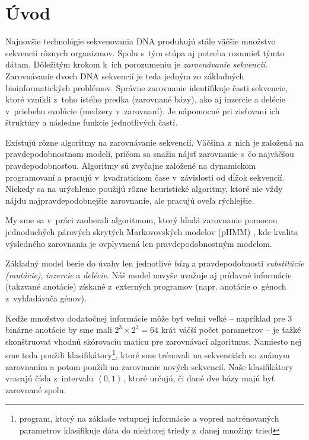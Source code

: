 \chapter*{Úvod}
{}

Najnovšie technológie sekvenovania DNA produkujú stále väčšie množstvo sekvencií rôznych organizmov. Spolu s~tým stúpa aj potreba rozumieť týmto dátam.
Dôležitým krokom k~ich porozumeniu je \textit{zarovnávanie sekvencií}.
Zarovnávanie dvoch DNA sekvencií je teda jedným zo základných
bioinformatických problémov. Správne zarovnanie identifikuje časti
sekvencie, ktoré vznikli z~toho istého predka (zarovnané bázy), ako aj
inzercie a delécie v~priebehu evolúcie (medzery v~zarovnaní).
Je nápomocné pri zisťovaní ich štruktúry a následne funkcie jednotlivých častí.

Existujú rôzne algoritmy na zarovnávanie sekvencií. Väčšina z~nich je založená na  pravdepodobnostnom modeli, pričom sa snažia nájsť zarovnanie s~čo najväčšou pravdepodobnosťou.
Algoritmy sú zvyčajne založené na dynamickom programovaní a pracujú v~kvadratickom čase v~závislosti od dĺžok sekvencií. Niekedy sa na urýchlenie použijú rôzne heuristické algoritmy, ktoré nie vždy nájdu najpravdepodobnejšie zarovnanie, ale pracujú oveľa rýchlejšie.

My sme sa v~práci zaoberali algoritmom, ktorý hľadá zarovnanie pomocou jednoduchých párových skrytých
Markovovských modelov (pHMM) \cite{durbin}, kde kvalita výsledného zarovnania je ovplyvnená len pravdepodobnostným modelom.

Základný model berie do úvahy len jednotlivé \textit{bázy} a pravdepodobnosti \textit{substitúcie (mutácie)}, \textit{inzercie} a \textit{delécie}.
Náš model navyše uvažuje aj prídavné informácie (takzvané anotácie) získané z~externých programov (napr. anotácie o~génoch z~vyhľadávača génov).

Keďže množstvo dodatočnej informácie môže byť veľmi veľké -- napríklad pre 3 binárne anotácie by sme mali $2^3 \times 2^3 = 64$ krát väčší počet parametrov --
je ťažké skonštruovať vhodnú skórovaciu maticu pre zarovnávací algoritmus.
Namiesto nej sme teda použili klasifikátory\footnote{program, ktorý na základe vstupnej informácie a vopred natrénovaných parametrov klasifikuje dáta do niektorej triedy z~danej množiny tried}, ktoré  sme trénovali na sekvenciách so známym zarovnaním a potom použili na zarovnanie nových sekvencií. Naše klasifikátory vracajú čísla z~intervalu $\left<0, 1\right>$, ktoré určujú, či dané dve bázy majú byť zarovnané spolu.

